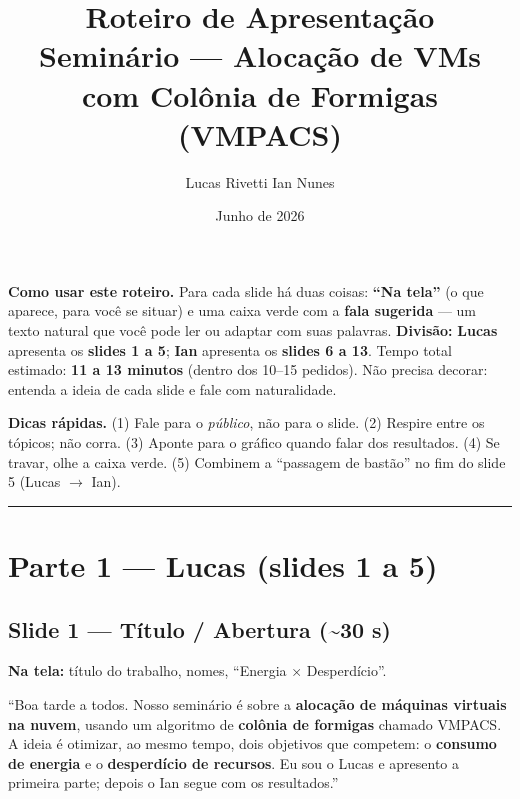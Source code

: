 \documentclass[11pt]{article}
\title{\textbf{Roteiro de Apresentação}\\[3pt]
\large Seminário --- Alocação de VMs com Colônia de Formigas (VMPACS)}
\author{Lucas Rivetti \quad Ian Nunes}
\date{Junho de 2026}
\newcommand{\tela}[1]{\noindent\textcolor{tela}{\textbf{Na tela:} #1}\par\vspace{2pt}}
\newcommand{\tempo}[1]{\hfill\textcolor{cinza}{\small(\textasciitilde #1)}}
\begin{document}
\maketitle
\begin{ideia}
\textbf{Como usar este roteiro.} Para cada slide há duas coisas: \textbf{``Na
tela''} (o que aparece, para você se situar) e uma caixa verde com a
\textbf{fala sugerida} --- um texto natural que você pode ler ou adaptar com
suas palavras. \textbf{Divisão:} \textbf{Lucas} apresenta os \textbf{slides 1 a
5}; \textbf{Ian} apresenta os \textbf{slides 6 a 13}. Tempo total estimado:
\textbf{11 a 13 minutos} (dentro dos 10--15 pedidos). Não precisa decorar:
entenda a ideia de cada slide e fale com naturalidade.
\end{ideia}

\begin{ideia}
\textbf{Dicas rápidas.} (1) Fale para o \emph{público}, não para o slide.
(2) Respire entre os tópicos; não corra. (3) Aponte para o gráfico quando
falar dos resultados. (4) Se travar, olhe a caixa verde. (5) Combinem a
``passagem de bastão'' no fim do slide 5 (Lucas $\to$ Ian).
\end{ideia}
\tableofcontents
\vspace{4pt}\hrule

\section{Parte 1 --- Lucas (slides 1 a 5)}

\subsection{Slide 1 --- Título / Abertura \tempo{30 s}}
\tela{título do trabalho, nomes, ``Energia × Desperdício''.}
\begin{fala}
``Boa tarde a todos. Nosso seminário é sobre a \textbf{alocação de máquinas
virtuais na nuvem}, usando um algoritmo de \textbf{colônia de formigas} chamado
VMPACS. A ideia é otimizar, ao mesmo tempo, dois objetivos que competem:
o \textbf{consumo de energia} e o \textbf{desperdício de recursos}. Eu sou o
Lucas e apresento a primeira parte; depois o Ian segue com os resultados.''
\end{fala}
\end{document}
